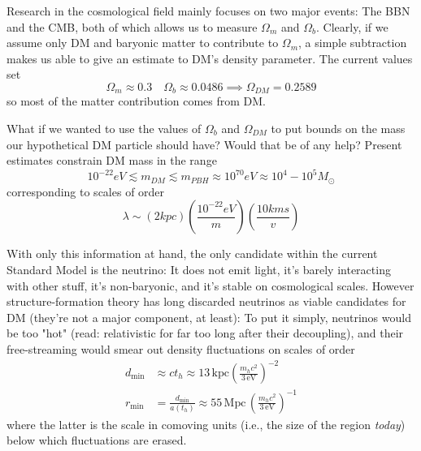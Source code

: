 \par Research in the cosmological field mainly focuses on two major events: The BBN and the CMB, both of which allows us to measure $\Omega_{m}$ and $\Omega_{b}$. Clearly, if we assume only DM and baryonic matter to contribute to $\Omega_{m}$, a simple subtraction makes us able to give an estimate to DM's density parameter. The current values set 
\begin{equation}
    \Omega_{m}\approx 0.3 \quad \Omega_{b} \approx 0.0486 \implies \Omega_{DM} = 0.2589
\end{equation}
so most of the matter contribution comes from DM.
\par What if we wanted to use the values of $\Omega_{b}$ and $\Omega_{DM}$ to put bounds on the mass our hypothetical DM particle should have? Would that be of any help? Present estimates constrain DM mass in the range 
\begin{equation}
    10^{-22}\unit{eV} \lesssim m_{DM} \lesssim m_{PBH}\approx 10^{70}\unit{eV} \approx 10^{4}-10^{5}M_{\odot}
\end{equation}
corresponding to scales of order 
\begin{equation}
    \lambda \sim (2\unit{kpc})\left(\frac{10^{-22}\unit{eV}}{m}\right)\left(\frac{10\unit{km}\unit{s}}{v}\right)
\end{equation}
\par With only this information at hand, the only candidate within the current Standard Model is the neutrino: It does not emit light, it's barely interacting with other stuff, it's non-baryonic, and it's stable on cosmological scales. However structure-formation theory has long discarded neutrinos as viable candidates for DM (they're not a major component, at least): To put it simply, neutrinos would be too "hot" (read: relativistic for far too long after their decoupling), and their free-streaming would smear out density fluctuations on scales of order
\begin{align}
    d_{\text{min}} &\approx ct_{h}\approx 13\,\text{kpc}\left(\frac{m_{h}c^{2}}{3\,\text{eV}}\right)^{-2}\\
    r_{\text{min}} &=\frac{d_{\text{min}}}{a(t_{h})}\approx 55\,\text{Mpc}\,\left(\frac{m_{h}c^{2}}{3\,\text{eV}}\right)^{-1}
    \label{eq:nrdimensions}
\end{align}
where the latter is the scale in comoving units (i.e., the size of the region \emph{today}) below which fluctuations are erased.
